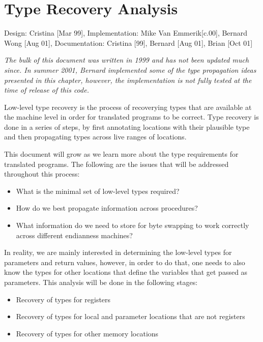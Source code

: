 %
%

\chapter{Type Recovery Analysis}
\label{ch-type}

\newtheorem{typerule}{Type Rule}[chapter]

{\small
\begin{flushright}
Design: Cristina [Mar 99], Implementation: Mike Van Emmerik[c.00], Bernard Wong [Aug 01], Documentation: Cristina [99], Bernard [Aug 01], Brian [Oct 01]
\end{flushright}
}

{\em The bulk of this document was written in 1999 and has not 
been updated much since.  In summer 2001, Bernard implemented some 
of the type propagation ideas presented in this chapter, 
however, the implementation is not fully tested at the 
time of release of this code.} 

Low-level type recovery is the process of recoverying types 
that are available at the machine level in order for 
translated programs to be correct.  
Type recovery is done in a series of steps, by first annotating
locations with their plausible type and then propagating 
types across live ranges of locations.  

This document will grow as we learn more about the type 
requirements for translated programs.  The following are 
the issues that will be addressed throughout this process: 
\begin{itemize}
\item What is the minimal set of low-level types required?
\item How do we best propagate information across procedures?
\item What information do we need to store for byte swapping 
	to work correctly across different endianness machines?
\end{itemize}

In reality, we are mainly interested in determining the low-level 
types for parameters and return values, however, in order to 
do that, one needs to also know the types for other locations 
that define the variables that get passed as parameters. 
This analysis will be done in the following stages: 
\begin{itemize}
\item Recovery of types for registers
\item Recovery of types for local and parameter locations that 
	are not registers 
\item Recovery of types for other memory locations
\end{itemize}

